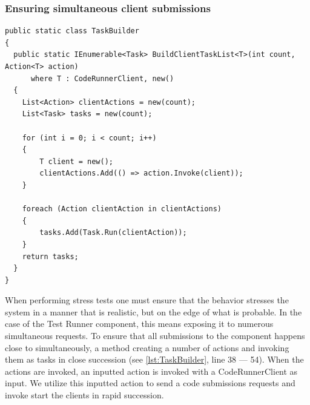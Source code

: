 \subsubsection{Ensuring simultaneous client submissions}
\begin{lstlisting}[language=CSharp, escapechar=~, caption={C\# code showing the BuildClientTaskList method, which is used to build a number of actions which are executed simultaneously in a Task}, label={lst:TaskBuilder}]
public static class TaskBuilder
{
  public static IEnumerable<Task> BuildClientTaskList<T>(int count, Action<T> action)
      where T : CodeRunnerClient, new()
  {
    List<Action> clientActions = new(count);
    List<Task> tasks = new(count);
    
    for (int i = 0; i < count; i++)
    {
        T client = new();
        clientActions.Add(() => action.Invoke(client));
    }

    foreach (Action clientAction in clientActions)
    {
        tasks.Add(Task.Run(clientAction));
    }
    return tasks;
  }
}
\end{lstlisting}
When performing stress tests one must ensure that the behavior stresses the system in a manner that is realistic, but on the edge of what is probable.
In the case of the Test Runner component, this means exposing it to numerous simultaneous requests. 
To ensure that all submissions to the component happens close to simultaneously, a method creating a number of actions and invoking them as tasks in close succession (see \ref{lst:TaskBuilder}, line 38 --- 54). 
When the actions are invoked, an inputted action is invoked with a CodeRunnerClient as input. 
We utilize this inputted action to send a code submissions requests and invoke start the clients in rapid succession.


